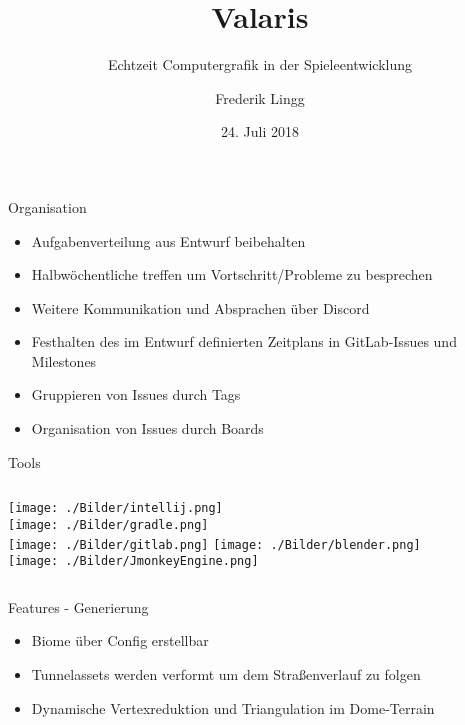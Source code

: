 \documentclass[10pt]{beamer}
\title{Valaris}
\subtitle{Echtzeit Computergrafik in der Spieleentwicklung}
\date{24. Juli 2018}
\author{Frederik Lingg}
\begin{document}
\maketitle

\begin{frame}{Organisation}
  \begin{itemize}
    \item Aufgabenverteilung aus Entwurf beibehalten
    \item Halbwöchentliche treffen um Vortschritt/Probleme zu besprechen
    \item Weitere Kommunikation und Absprachen über Discord
    \item Festhalten des im Entwurf definierten Zeitplans in GitLab-Issues und Milestones
    \item Gruppieren von Issues durch Tags
    \item Organisation von Issues durch Boards
  \end{itemize}
\end{frame}

\begin{frame}[standout]{Tools}
    \begin{columns}[t]
            \centering
            \texttt{[image: ./Bilder/intellij.png]}\\
            \texttt{[image: ./Bilder/gradle.png]}\\
            \vspace{.2cm}
            \texttt{[image: ./Bilder/gitlab.png]}
            \centering
            \texttt{[image: ./Bilder/blender.png]}\\
            \vspace{.2cm}
            \texttt{[image: ./Bilder/JmonkeyEngine.png]}
    \end{columns}
\end{frame}

\begin{frame}{Features - Generierung}
\begin{itemize}
    \item Biome über Config erstellbar
    \item Tunnelassets werden verformt um dem Straßenverlauf zu folgen
    \item Dynamische Vertexreduktion und Triangulation im Dome-Terrain
\end{itemize}
\end{frame}
\end{document}
